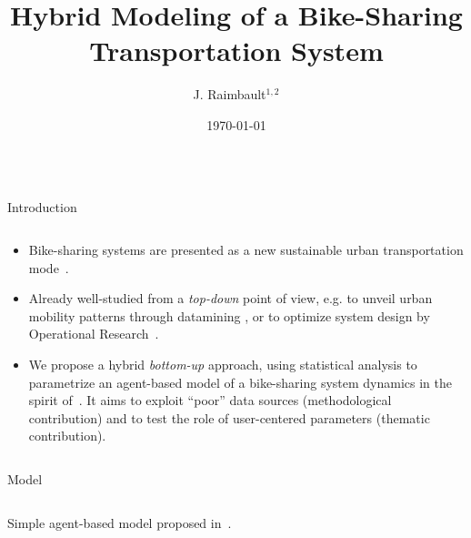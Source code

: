\documentclass{beamer}
\title[Beamer Poster]{Hybrid Modeling of a Bike-Sharing Transportation System}
\author[juste.raimbault@polytechnique.edu]{J. Raimbault$^{1,2}$}
\institute[]
  {$^1$ UMR 8504 CNRS - Géographie-Cités, $^2$ UMR-T 9403 IFSTTAR - LVMT\vspace{1cm}}
\date{\today}
\begin{document}
  \begin{frame}{} 
  
    \vfill
    \begin{columns}[t]
      \begin{column}{.49\textwidth}
      
      \vspace{-0.5cm}
      
      
        \begin{block}{Introduction}
        \vspace{-1cm}
        \begin{columns}[t]
        \begin{column}{.95\textwidth}
          \begin{itemize}         
          \item \begin{justify}Bike-sharing systems are presented as a new sustainable urban transportation mode~\cite{midgley2009role}.
          \end{justify}
          \bigskip
          \item \begin{justify}
          Already well-studied from a \emph{top-down} point of view, e.g. to unveil urban mobility patterns through datamining \cite{o2013mining,borgnat2009modelisation}, or to optimize system design by Operational Research~\cite{lin2011strategic}.
          \end{justify}
          \bigskip
          \item \begin{justify}We propose a hybrid \emph{bottom-up} approach, using statistical analysis to parametrize an agent-based model of a bike-sharing system dynamics in the spirit of~\cite{kohler2014long}. It aims to exploit ``poor'' data sources (methodological contribution) and to test the role of user-centered parameters (thematic contribution).
          
          \end{justify}
          \end{itemize}
          \end{column}
          \end{columns}
        \end{block}
        
        
        
        
         \begin{block}{Model}
        \begin{columns}[t]
        \begin{column}{.95\textwidth}
        \vspace{-2cm}
        \begin{justify}
          Simple agent-based model proposed in~\cite{raimbault2015user}.
          

\end{justify}
\end{column}
\end{columns}
\end{block}
\end{column}
\end{columns}
\end{frame}
\end{document}
